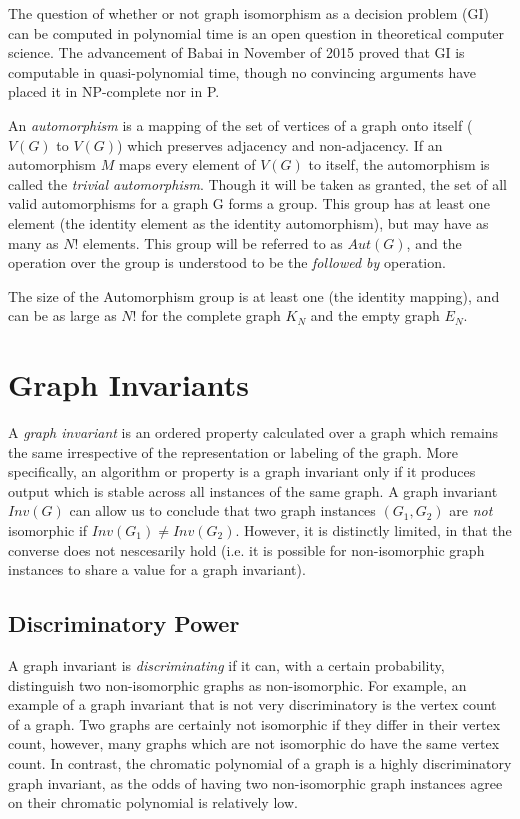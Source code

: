 The question of whether or not graph isomorphism as a decision problem (GI) can be computed in polynomial time is an open question in theoretical computer science.
The advancement of Babai in November of 2015 proved that GI is computable in quasi-polynomial time, though no convincing arguments have placed it in NP-complete nor in P.

An \emph{automorphism} is a mapping of the set of vertices of a graph onto itself ($V(G)$ to $V(G)$) which preserves adjacency and non-adjacency.
If an automorphism $M$ maps every element of $V(G)$ to itself, the automorphism is called the \emph{trivial automorphism}.
Though it will be taken as granted, the set of all valid automorphisms for a graph G forms a group.
This group has at least one element (the identity element as the identity automorphism), but may have as many as $N!$ elements.
This group will be referred to as $Aut(G)$, and the operation over the group is understood to be the \emph{followed by} operation.

The size of the Automorphism group is at least one (the identity mapping), and can be as large as $N!$ for the complete graph $K_N$ and the empty graph $E_N$.

\section{Graph Invariants}
A \emph{graph invariant} is an ordered property calculated over a graph which remains the same irrespective of the representation or labeling of the graph.
More specifically, an algorithm or property is a graph invariant only if it produces output which is stable across all instances of the same graph.
A graph invariant $Inv(G)$ can allow us to conclude that two graph instances $(G_1, G_2)$ are \emph{not} isomorphic if $Inv(G_1) \neq Inv(G_2)$.
However, it is distinctly limited, in that the converse does not nescesarily hold (i.e. it is possible for non-isomorphic graph instances to share a value for a graph invariant).


\subsection{Discriminatory Power}
A graph invariant is \emph{discriminating} if it can, with a certain probability, distinguish two non-isomorphic graphs as non-isomorphic.
For example, an example of a graph invariant that is not very discriminatory is the vertex count of a graph.
Two graphs are certainly not isomorphic if they differ in their vertex count, however, many graphs which are not isomorphic do have the same vertex count.
In contrast, the chromatic polynomial of a graph is a highly discriminatory graph invariant, as the odds of having two non-isomorphic graph instances agree on their chromatic polynomial is relatively low.

